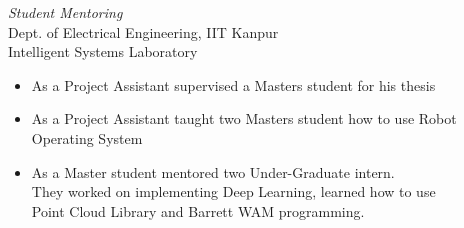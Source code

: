 \documentclass[margin,line]{resume}
\begin{document}
\begin{resume}
	
	
	

	
    


    \emph{Student Mentoring}\\
    Dept. of Electrical Engineering, IIT Kanpur\\
    Intelligent Systems Laboratory
    
    \begin{itemize}
    \item As a Project Assistant supervised a Masters student for his thesis
    \item As a Project Assistant taught two Masters student how to use Robot \\Operating System
    \item As a Master student mentored two Under-Graduate intern. \\They worked on implementing Deep Learning, learned how to use \\Point Cloud Library and Barrett WAM programming.
    \end{itemize}
	


\end{resume}
\end{document}
